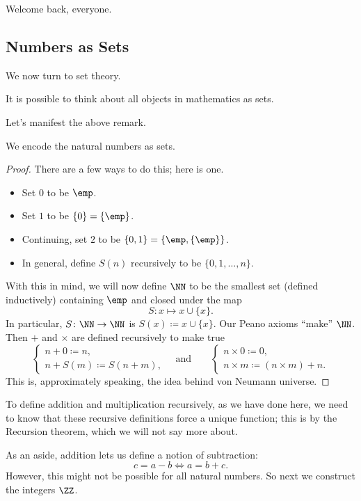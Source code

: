 \documentclass[../notes.tex]{subfiles}
\begin{document}

Welcome back, everyone.

\subsection{Numbers as Sets}
We now turn to set theory.
\begin{remark}
	It is possible to think about all objects in mathematics as sets.
\end{remark}
Let's manifest the above remark.
\begin{exe}
	We encode the natural numbers as sets.
\end{exe}
\begin{proof}
	There are a few ways to do this; here is one.
	\begin{itemize}
		\item Set $0$ to be $\emp$.
		\item Set $1$ to be $\{0\}=\{\emp\}$.
		\item Continuing, set $2$ to be $\{0,1\}=\{\emp,\{\emp\}\}$.
		\item In general, define $S(n)$ recursively to be $\{0,1,\ldots,n\}$.
	\end{itemize}
	With this in mind, we will now define $\NN$ to be the smallest set (defined inductively) containing $\emp$ and closed under the map
	\[S\colon x\mapsto x\cup\{x\}.\]
	In particular, $S\colon\NN\to\NN$ is $S(x)\coloneqq x\cup\{x\}$. Our Peano axioms ``make'' $\NN$. Then $+$ and $\times$ are defined recursively to make true
	\[\begin{cases}
		n+0\coloneqq n, \\
		n+S(m)\coloneqq S(n+m),
	\end{cases}\quad\text{and}\qquad\begin{cases}
		n\times0\coloneqq0, \\
		n\times m\coloneqq(n\times m)+n.
	\end{cases}\]
	This is, approximately speaking, the idea behind von Neumann universe.
\end{proof}
\begin{remark}
	To define addition and multiplication recursively, as we have done here, we need to know that these recursive definitions force a unique function; this is by the Recursion theorem, which we will not say more about.
\end{remark}
As an aside, addition lets us define a notion of subtraction:
\[c=a-b\iff a=b+c.\]
However, this might not be possible for all natural numbers. So next we construct the integers $\ZZ$.
\end{document}
